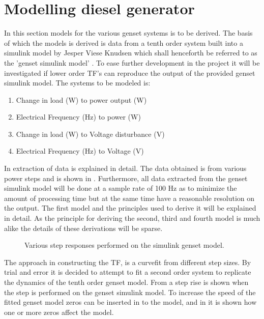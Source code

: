 
\section{Modelling diesel generator}
\label{modelling_diesel_generator}
In this section models for the various genset systems is to be derived. The basis of which the models is derived is data from a tenth order system built into a simulink model by Jesper Viese Knudsen which shall henceforth be referred to as the 'genset simulink model' \cite{Jesper_paper}. To ease further development in the project it will be investigated if lower order TF's can reproduce the output of the provided genset simulink model. The systems to be modeled is:
\begin{enumerate}
	\item Change in load (W) to power output (W)
	\item Electrical Frequency (Hz) to power (W)
	\item Change in load (W) to Voltage disturbance (V)
	\item Electrical Frequency (Hz) to Voltage (V)
\end{enumerate}

In  extraction of data is explained in detail. The data obtained is from various power steps and is shown in . Furthermore, all data extracted from the genset simulink model will be done at a sample rate of 100 Hz as to minimize the amount of processing time but at the same time have a reasonable resolution on the output. 
The first model and the principles used to derive it will be explained in detail. As the principle for deriving the second, third and fourth model is much alike the details of these derivations will be sparse.

\begin{figure}[H]
\centering

\caption{Various step responses performed on the simulink genset model.}
\label{fig:stepresponses_simulinkgensetmodel}
\end{figure}



The approach in constructing the TF, is a curvefit from different step sizes. By trial and error it is decided to attempt to fit a second order system to replicate the dynamics of the tenth order genset model. From  a step rise is shown when the step is performed on the genset simulink model. To increase the speed of the fitted genset model zeros can be inserted in to the model, and in  it is shown how one or more zeros affect the model.


